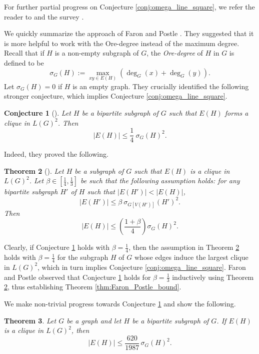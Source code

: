 \documentclass[11pt]{article}
\theoremstyle{plain}
\newtheorem{theorem}{Theorem}[section]
\newtheorem{conjecture}[theorem]{Conjecture}
\numberwithin{equation}{section}
\begin{document}
For further partial progress on Conjecture \ref{conj:omega_line_square}, we refer the reader to \cite{Debski_Nowak_2021, Debski_Nowak_2022, Cho_Choi_Kim_Park_2021, Batenburg_Kang_Pirot_2020} and the survey \cite{Cranston_2023}. 

We quickly summarize the approach of Faron and Postle \cite{Faron_Postle_2019}. They suggested that it is more helpful to work with the Ore-degree instead of the maximum degree. Recall that if $H$ is a non-empty subgraph of $G$, the \emph{Ore-degree} of $H$ in $G$ is defined to be
\[
   \sigma_G(H):=\max_{xy\in E(H)}(\deg_G(x)+\deg_G(y)).
\]
Let $\sigma_G(H) = 0$ if $H$ is an empty graph. They crucially identified the following stronger conjecture, which implies Conjecture \ref{conj:omega_line_square}.

\begin{conjecture}[\cite{Faron_Postle_2019}]\label{conj:bipartite_subgraph} Let $H$ be a bipartite subgraph of $G$ such that $E(H)$ forms a clique in $L(G)^2$. Then 
\[ |E(H)|\le \frac{1}{4} \ \sigma_G(H)^2.\]
\end{conjecture}

Indeed, they proved the following.

\begin{theorem}[\cite{Faron_Postle_2019}]\label{thm:conditional_result}
Let $H$ be a subgraph of $G$ such that $E(H)$ is a clique in $L(G)^2$. Let $\beta \in [\frac{1}{4}, \frac{1}{3}]$ be such that the following assumption holds: for any bipartite subgraph $H'$ of $H$ such that $|E(H')|<|E(H)|$, \[|E(H')|\le \beta \ \sigma_{G[V(H')]}(H')^2.\]
Then
\[ |E(H)|\le \left(\frac{1 + \beta}{4}\right)\sigma_G(H)^2. \]
\end{theorem}

Clearly, if Conjecture \ref{conj:bipartite_subgraph} holds with $\beta = \frac{1}{4}$, then the assumption in Theorem \ref{thm:conditional_result} holds with $\beta = \frac{1}{4}$ for the subgraph $H$ of $G$ whose edges induce the largest clique in $L(G)^2$, which in turn implies Conjecture \ref{conj:omega_line_square}. Faron and Postle observed that Conjecture \ref{conj:bipartite_subgraph} holds for $\beta = \frac{1}{3}$ inductively using Theorem \ref{thm:conditional_result}, thus establishing Theorem \ref{thm:Faron_Postle_bound}. 

We make non-trivial progress towards Conjecture \ref{conj:bipartite_subgraph} and show the following.

\begin{theorem}\label{thm:bipartite_subgraph}
Let $G$ be a graph and let $H$ be a bipartite subgraph of $G$. If
$E(H)$ is a clique in $L(G)^2$, then
\[
   |E(H)|\le \frac{620}{1987}\,\sigma_G(H)^2.
\]
\end{theorem}
\end{document}
